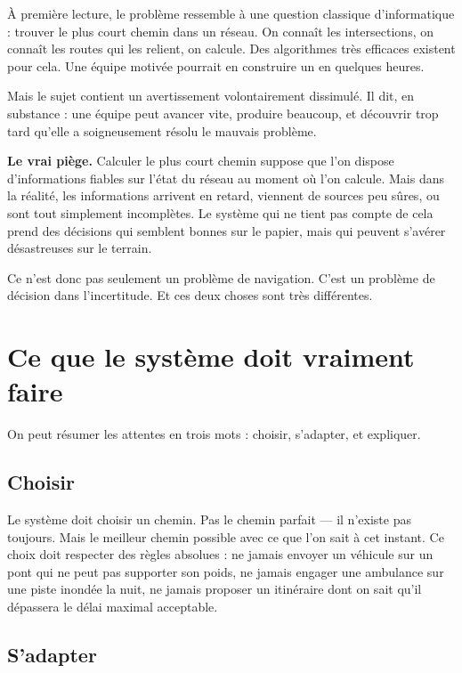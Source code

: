 \documentclass[12pt, a4paper]{article}
\begin{document}
À première lecture, le problème ressemble à une question classique
d'informatique : trouver le plus court chemin dans un réseau. On connaît
les intersections, on connaît les routes qui les relient, on calcule.
Des algorithmes très efficaces existent pour cela. Une équipe motivée
pourrait en construire un en quelques heures.

Mais le sujet contient un avertissement volontairement dissimulé. Il dit,
en substance : une équipe peut avancer vite, produire beaucoup, et
découvrir trop tard qu'elle a soigneusement résolu le mauvais problème.

\begin{alerte}
\textbf{Le vrai piège.}
Calculer le plus court chemin suppose que l'on dispose d'informations
fiables sur l'état du réseau au moment où l'on calcule. Mais dans la
réalité, les informations arrivent en retard, viennent de sources peu
sûres, ou sont tout simplement incomplètes. Le système qui ne tient pas
compte de cela prend des décisions qui semblent bonnes sur le papier,
mais qui peuvent s'avérer désastreuses sur le terrain.
\end{alerte}

Ce n'est donc pas seulement un problème de navigation. C'est un problème
de décision dans l'incertitude. Et ces deux choses sont très différentes.


\section{Ce que le système doit vraiment faire}

On peut résumer les attentes en trois mots : choisir, s'adapter,
et expliquer.

\subsection{Choisir}

Le système doit choisir un chemin. Pas le chemin parfait — il n'existe
pas toujours. Mais le meilleur chemin possible avec ce que l'on sait
à cet instant. Ce choix doit respecter des règles absolues : ne jamais
envoyer un véhicule sur un pont qui ne peut pas supporter son poids,
ne jamais engager une ambulance sur une piste inondée la nuit, ne jamais
proposer un itinéraire dont on sait qu'il dépassera le délai maximal
acceptable.

\subsection{S'adapter}
\end{document}
